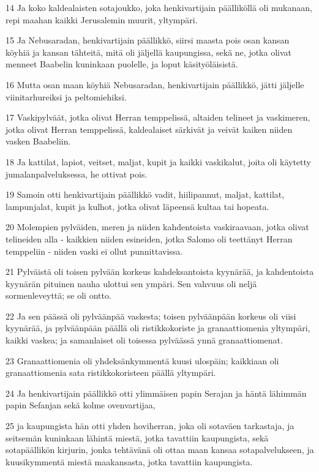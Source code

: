 \par 14 Ja koko kaldealaisten sotajoukko, joka henkivartijain päälliköllä oli mukanaan, repi maahan kaikki Jerusalemin muurit, yltympäri.
\par 15 Ja Nebusaradan, henkivartijain päällikkö, siirsi maasta pois osan kansan köyhiä ja kansan tähteitä, mitä oli jäljellä kaupungissa, sekä ne, jotka olivat menneet Baabelin kuninkaan puolelle, ja loput käsityöläisistä.
\par 16 Mutta osan maan köyhiä Nebusaradan, henkivartijain päällikkö, jätti jäljelle viinitarhureiksi ja peltomiehiksi.
\par 17 Vaskipylväät, jotka olivat Herran temppelissä, altaiden telineet ja vaskimeren, jotka olivat Herran temppelissä, kaldealaiset särkivät ja veivät kaiken niiden vasken Baabeliin.
\par 18 Ja kattilat, lapiot, veitset, maljat, kupit ja kaikki vaskikalut, joita oli käytetty jumalanpalveluksessa, he ottivat pois.
\par 19 Samoin otti henkivartijain päällikkö vadit, hiilipannut, maljat, kattilat, lampunjalat, kupit ja kulhot, jotka olivat läpeensä kultaa tai hopeata.
\par 20 Molempien pylväiden, meren ja niiden kahdentoista vaskiraavaan, jotka olivat telineiden alla - kaikkien niiden esineiden, jotka Salomo oli teettänyt Herran temppeliin - niiden vaski ei ollut punnittavissa.
\par 21 Pylväistä oli toisen pylvään korkeus kahdeksantoista kyynärää, ja kahdentoista kyynärän pituinen nauha ulottui sen ympäri. Sen vahvuus oli neljä sormenleveyttä; se oli ontto.
\par 22 Ja sen päässä oli pylväänpää vaskesta; toisen pylväänpään korkeus oli viisi kyynärää, ja pylväänpään päällä oli ristikkokoriste ja granaattiomenia yltympäri, kaikki vaskea; ja samanlaiset oli toisessa pylväässä ynnä granaattiomenat.
\par 23 Granaattiomenia oli yhdeksänkymmentä kuusi ulospäin; kaikkiaan oli granaattiomenia sata ristikkokoristeen päällä yltympäri.
\par 24 Ja henkivartijain päällikkö otti ylimmäisen papin Serajan ja häntä lähimmän papin Sefanjan sekä kolme ovenvartijaa,
\par 25 ja kaupungista hän otti yhden hoviherran, joka oli sotaväen tarkastaja, ja seitsemän kuninkaan lähintä miestä, jotka tavattiin kaupungista, sekä sotapäällikön kirjurin, jonka tehtävänä oli ottaa maan kansaa sotapalvelukseen, ja kuusikymmentä miestä maakansasta, jotka tavattiin kaupungista.
